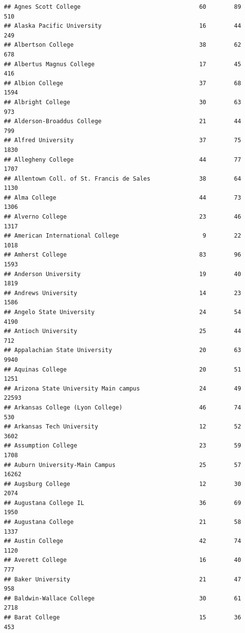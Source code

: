\documentclass[
]{article}
\begin{document}
\begin{verbatim}
## Agnes Scott College                                  60        89         510
## Alaska Pacific University                            16        44         249
## Albertson College                                    38        62         678
## Albertus Magnus College                              17        45         416
## Albion College                                       37        68        1594
## Albright College                                     30        63         973
## Alderson-Broaddus College                            21        44         799
## Alfred University                                    37        75        1830
## Allegheny College                                    44        77        1707
## Allentown Coll. of St. Francis de Sales              38        64        1130
## Alma College                                         44        73        1306
## Alverno College                                      23        46        1317
## American International College                        9        22        1018
## Amherst College                                      83        96        1593
## Anderson University                                  19        40        1819
## Andrews University                                   14        23        1586
## Angelo State University                              24        54        4190
## Antioch University                                   25        44         712
## Appalachian State University                         20        63        9940
## Aquinas College                                      20        51        1251
## Arizona State University Main campus                 24        49       22593
## Arkansas College (Lyon College)                      46        74         530
## Arkansas Tech University                             12        52        3602
## Assumption College                                   23        59        1708
## Auburn University-Main Campus                        25        57       16262
## Augsburg College                                     12        30        2074
## Augustana College IL                                 36        69        1950
## Augustana College                                    21        58        1337
## Austin College                                       42        74        1120
## Averett College                                      16        40         777
## Baker University                                     21        47         958
## Baldwin-Wallace College                              30        61        2718
## Barat College                                        15        36         453

\end{verbatim}
\end{document}
